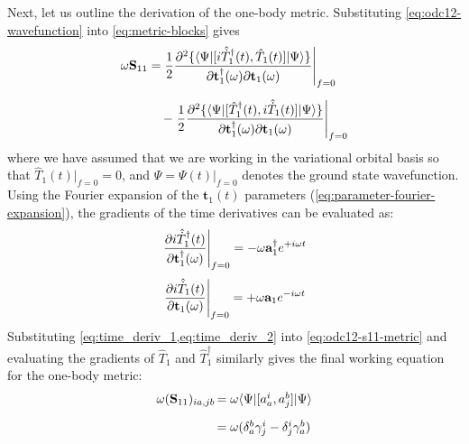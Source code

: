 Next, let us outline the derivation of the one-body metric.
Substituting \cref{eq:odc12-wavefunction} into \cref{eq:metric-blocks} gives
\begin{equation}
    \label{eq:odc12-s11-metric}
    \begin{array}{r@{\,}l}
        \omega
        \mathbf{S}_{11}
        =
        &
        \left.
            \dfrac{1}{2}
            \dfrac{%
                \partial^2
                \{\langle\Psi|
                    [i\hat{\dot{T}}_1^\dagger(t), \hat{T}_1(t)]
                |\Psi\rangle\}
            }{%
                \partial \mathbf{t}_1^\dagger(\omega)
                \partial \mathbf{t}_1(\omega)
            }
        \right|_{f=0}
        \\[20pt]
        &
        -
        \left.
            \dfrac{1}{2}
            \dfrac{%
                \partial^2
                \{\langle\Psi|[\hat{T}_1^\dagger(t), i\hat{\dot{T}}_1(t)]|\Psi\rangle\}
            }{%
                \partial \mathbf{t}_1^\dagger(\omega)
                \partial \mathbf{t}_1(\omega)
            }
        \right|_{f=0}
    \end{array}
\end{equation}
where we have assumed that we are working in the variational orbital basis so that
\(
    \hat{T}_1(t)|_{f=0}
    =
    0
\),
and
\(
    \Psi
    =
    \Psi(t)|_{f=0}
\)
denotes the ground state wavefunction.
Using the Fourier expansion of the $\mathbf{t}_1(t)$ parameters
(\cref{eq:parameter-fourier-expansion}), the gradients of the time derivatives
can be evaluated as:
\begin{equation}
    \label{eq:time_deriv_1}
    \left.
    \frac{%
        \partial i \hat{\dot{T}}_1^\dagger(t)
    }{%
        \partial \mathbf{t}_1^\dagger(\omega)
    }
    \right|_{f=0}
    =
    -
    \omega
    \mathbf{a}_1^\dagger
    e^{+i\omega t}
\end{equation}
\begin{equation}
    \label{eq:time_deriv_2}
    \left.
    \frac{%
        \partial i \hat{\dot{T}}_1(t)
    }{%
        \partial \mathbf{t}_1(\omega)
    }
    \right|_{f=0}
    =
    +
    \omega
    \mathbf{a}_1
    e^{-i\omega t}
\end{equation}
Substituting \cref{eq:time_deriv_1,eq:time_deriv_2} into \cref{eq:odc12-s11-metric} and evaluating the gradients
of \(\hat{T}_1\) and \(\hat{T}_1^\dagger\) similarly gives the final working equation for
the one-body metric:
\begin{equation}
    \begin{array}{r@{\,}l}
        \omega
        (\mathbf{S}_{11})_{ia,jb}
        &=
        \omega
        \langle\Psi|
        [a_a^i, a_j^b]
        |\Psi\rangle
        \\[10pt]
        &=
        \omega
        (
            \delta^b_a
            \gamma^i_j
            -
            \delta^i_j
            \gamma^b_a
        )
    \end{array}
\end{equation}


